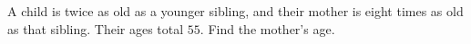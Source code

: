 A child is twice as old as a younger sibling, and their mother is eight times as old as that sibling. Their ages total $55$. Find the mother's age.

